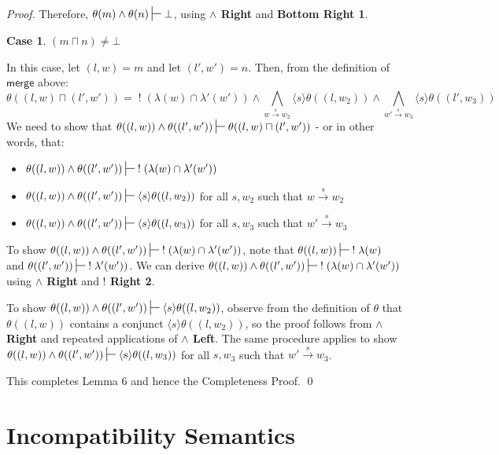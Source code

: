 \documentclass[smallextended]{svjour3}       %
\newtheorem{mycase}{Case}
\numberwithin{subcase}{mycase}
\def\judge {\sststile{\mathrm{}}{}}
\begin{document}
\begin{proof}
Therefore,  $\theta(m) \land \theta(n) \judge \bot$, using  {\bf $\land$ Right} and  {\bf Bottom Right 1}.
\begin{mycase}
$(m \sqcap n) \neq \bot$
\end{mycase}
In this case, let $(l,w) = m$ and let $(l',w')=n$.
Then, from the definition of $\mathsf{merge}$ above:
\[
\theta((l,w) \sqcap (l',w')) = \; ! \; (\lambda(w) \cap \lambda'(w')) \land \bigwedge_{w \xrightarrow{s} w_2} \langle s \rangle \theta((l, w_2)) \land \bigwedge_{w' \xrightarrow{s} w_3} \langle s \rangle \theta((l', w_3))
\]
We need to show that $\theta((l,w)) \land \theta((l',w')) \judge \theta((l,w) \sqcap (l',w'))$ - or in other words, that:
\begin{itemize}
\item
$\theta((l,w)) \land \theta((l',w')) \judge \; ! \; (\lambda(w) \cap \lambda'(w'))$
\item
$\theta((l,w)) \land \theta((l',w')) \judge \langle s \rangle \theta((l, w_2))$ for all $s,w_2$ such that $w \xrightarrow{s} w_2$
\item
$\theta((l,w)) \land \theta((l',w')) \judge \langle s \rangle \theta((l, w_3))$ for all $s,w_3$ such that $w' \xrightarrow{s} w_3$
\end{itemize}
To show $\theta((l,w)) \land \theta((l',w')) \judge \; ! \; (\lambda(w) \cap \lambda'(w'))$, note that $\theta((l,w))  \judge \; ! \; \lambda(w)$ and $\theta((l',w')) \judge \; ! \;  \lambda'(w'))$.
We can derive $\theta((l,w)) \land \theta((l',w')) \judge \; ! \; (\lambda(w) \cap \lambda'(w'))$ using {\bf $\land$ Right} and {\bf $!$ Right 2}. 

To show $\theta((l,w)) \land \theta((l',w')) \judge \langle s \rangle \theta((l, w_2))$, observe from the definition of $\theta$ that $\theta((l,w))$ contains a conjunct $\langle s \rangle \theta((l, w_2))$, so the proof follows from  {\bf $\land$ Right} and repeated applications of  {\bf $\land$ Left}. The same procedure applies to show $\theta((l,w)) \land \theta((l',w')) \judge \langle s \rangle \theta((l, w_3))$ for all $s,w_3$ such that $w' \xrightarrow{s} w_3$.

This completes Lemma 6 and hence the Completeness Proof.
\qed

\end{proof}

\section{Incompatibility Semantics}
\end{document}
